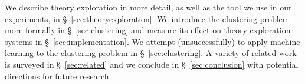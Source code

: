 We describe theory exploration in more detail, as well as the \qspec{} tool we
use in our experiments, in \S~\ref{sec:theoryexploration}. We introduce the
clustering problem more formally in \S~\ref{sec:clustering} and measure its
effect on theory exploration systems in \S~\ref{sec:implementation}. We attempt
(unsuccessfully) to apply machine learning to the clustering problem in
\S~\ref{sec:clustering}.  A variety of related work is surveyed in
\S~\ref{sec:related} and we conclude in \S~\ref{sec:conclusion} with potential
directions for future research.
